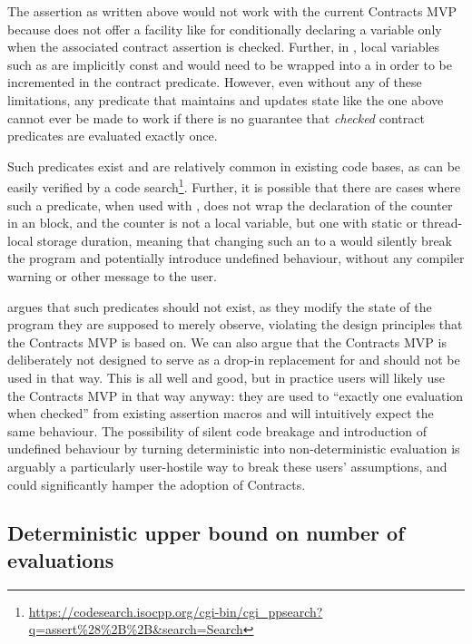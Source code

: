 The assertion as written above would not work with the current Contracts MVP because \cite{P2900R6} does not offer a facility like  for conditionally declaring a variable only when the associated contract assertion is checked. Further, in \cite{P2900R6}, local variables such as  are implicitly const and would need to be wrapped into a  in order to be incremented in the contract predicate. However, even without any of these limitations, any predicate that maintains and updates state like the one above cannot ever be made to work if there is no guarantee that \emph{checked} contract predicates are evaluated exactly once. 

Such predicates exist and are relatively common in existing code bases, as can be easily verified by a code search\footnote{\url{https://codesearch.isocpp.org/cgi-bin/cgi_ppsearch?q=assert\%28\%2B\%2B&search=Search}}. Further, it is possible that there are cases where such a predicate, when used with , does not wrap the declaration of the counter in an  block, and the counter is not a local variable, but one with static or thread-local storage duration, meaning that changing such an  to a  would silently break the program and potentially introduce undefined behaviour, without any compiler warning or other message to the user.

\cite{P2900R6} argues that such predicates should not exist, as they modify the state of the program they are supposed to merely observe, violating the design principles that the Contracts MVP is based on. We can also argue that the Contracts MVP is deliberately not designed to serve as a drop-in replacement for  and should not be used in that way. This is all well and good, but in practice users will likely use the Contracts MVP in that way anyway: they are used to ``exactly one evaluation when checked'' from existing assertion macros and will intuitively expect the same behaviour. The possibility of silent code breakage and introduction of undefined behaviour by turning deterministic into non-deterministic evaluation is arguably a particularly user-hostile way to break these users' assumptions, and could significantly hamper the adoption of Contracts.

\subsection{Deterministic upper bound on number of evaluations}
\label{subsec:upper}

